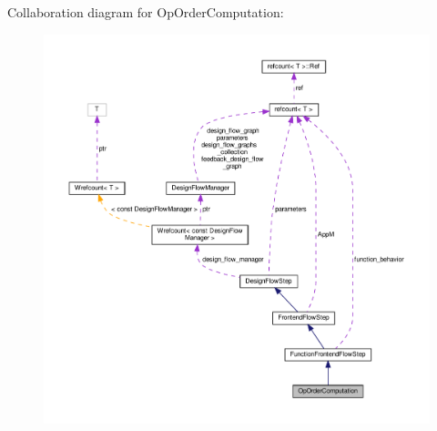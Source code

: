 Collaboration diagram for Op\+Order\+Computation\+:
\nopagebreak
\begin{figure}[H]
\begin{center}
\leavevmode
\includegraphics[width=350pt]{d8/d50/classOpOrderComputation__coll__graph}
\end{center}
\end{figure}
